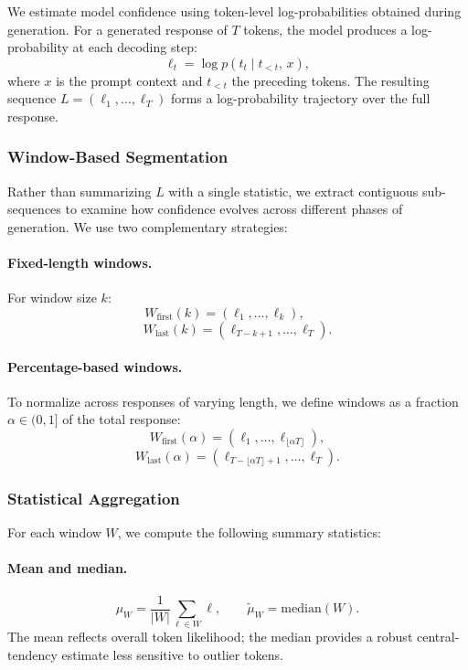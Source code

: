 \documentclass[11pt]{article}
\begin{document}
We estimate model confidence using token-level log-probabilities obtained during generation. For a generated response of $T$ tokens, the model produces a log-probability at each decoding step:
\[
\ell_t = \log p(t_t \mid t_{<t},\, x),
\]
where $x$ is the prompt context and $t_{<t}$ the preceding tokens. The resulting sequence $L = (\ell_1, \dots, \ell_T)$ forms a log-probability trajectory over the full response.


\subsubsection{Window-Based Segmentation}

Rather than summarizing $L$ with a single statistic, we extract contiguous sub-sequences to examine how confidence evolves across different phases of generation. We use two complementary strategies:

\paragraph{Fixed-length windows.} For window size $k$:
$$
W_{\text{first}}(k) = (\ell_1, \dots, \ell_k), \qquad
$$
$$
W_{\text{last}}(k)  = (\ell_{T-k+1}, \dots, \ell_T).
$$

\paragraph{Percentage-based windows.} To normalize across responses of varying length, we define windows as a fraction $\alpha \in (0,1]$ of the total response:
$$
W_{\text{first}}(\alpha) = (\ell_1, \dots, \ell_{\lfloor \alpha T \rfloor}), 
$$
$$
W_{\text{last}}(\alpha)  = (\ell_{T - \lfloor \alpha T \rfloor + 1}, \dots, \ell_T).
$$

\subsubsection{Statistical Aggregation}

For each window $W$, we compute the following summary statistics:

\paragraph{Mean and median.}
\[
\mu_W = \frac{1}{|W|}\sum_{\ell \in W} \ell, 
\qquad 
\tilde{\mu}_W = \mathrm{median}(W).
\]
The mean reflects overall token likelihood; the median provides a robust central-tendency estimate less sensitive to outlier tokens.
\end{document}

